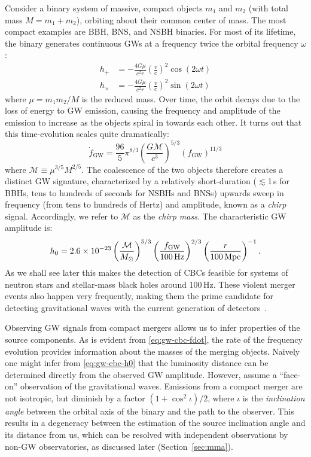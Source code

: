 Consider a binary system of massive, compact objects $m_1$ and $m_2$ (with total mass $M = m_1 + m_2$), orbiting about their common center of mass.
The most compact examples are \ac{BBH}, \ac{BNS}, and \ac{NSBH} binaries.
For most of its lifetime, the binary generates continuous \acp{GW} at a frequency twice the orbital frequency $\omega$:
\begin{align}
	\label{eq:gw-cbc-hplus}
	h_+ &= -\frac{4 G \mu}{c^2 r} \left(\frac{v}{c}\right)^2 \cos (2 \omega t) \\
	\label{eq:gw-cbc-hcross}
	h_{\times} &= -\frac{4 G \mu}{c^2 r} \left(\frac{v}{c}\right)^2 \sin (2 \omega t)
\end{align}
where $\mu = m_1 m_2 / M$ is the reduced mass.
Over time, the orbit decays due to the loss of energy to \ac{GW} emission, causing the frequency and amplitude of the emission to increase as the objects spiral in towards each other.
It turns out that this time-evolution scales quite dramatically:
\begin{equation}\label{eq:gw-cbc-fdot}
	\dot{f}_{\textrm{GW}} = \frac{96}{5}\pi^{8/3} \left(\frac{G \mathcal{M}}{c^3}\right)^{5/3} (f_{\textrm{GW}})^{11/3}
\end{equation}
where $\mathcal{M} \equiv \mu^{3/5} M^{2/5}$.
The coalescence of the two objects therefore creates a distinct \ac{GW} signature, characterized by a relatively short-duration ($\lesssim$1\,s for \acp{BBH}, tens to hundreds of seconds for \acp{NSBH} and \acp{BNS}) upwards sweep in frequency (from tens to hundreds of Hertz) and amplitude, known as a \textit{chirp} signal.
Accordingly, we refer to $\mathcal{M}$ as the \textit{chirp mass}.
The characteristic GW amplitude is:
\begin{equation}\label{eq:gw-cbc-h0}
	h_0 = 2.6 \times 10^{-23} \left( \frac{\mathcal{M}}{M_{\odot}} \right)^{5/3} \left( \frac{f_{\mathrm{GW}}}{100\,\mathrm{Hz}} \right)^{2/3} \left( \frac{r}{100\,\mathrm{Mpc}} \right)^{-1}.
\end{equation}
As we shall see later this makes the detection of \acp{CBC} feasible for systems of neutron stars and stellar-mass black holes around 100\,Hz.
These violent merger events also happen very frequently, making them the prime candidate for detecting gravitational waves with the current generation of detectors~\citep{aLIGO_prospects}.

Observing GW signals from compact mergers allows us to infer properties of the source components.
As is evident from \cref{eq:gw-cbc-fdot}, the rate of the frequency evolution provides information about the masses of the merging objects.
Naively one might infer from \cref{eq:gw-cbc-h0} that the luminosity distance can be determined directly from the observed GW amplitude.
However,  assume a ``face-on'' observation of the gravitational waves.
Emissions from a compact merger are not isotropic, but diminish by a factor $(1 + \cos^2 \iota) / 2$, where $\iota$ is the \textit{inclination angle} between the orbital axis of the binary and the path to the observer.
This results in a degeneracy between the estimation of the source inclination angle and its distance from us, which can be resolved with independent observations by non-GW observatories, as discussed later (Section~\ref{sec:mma}).

